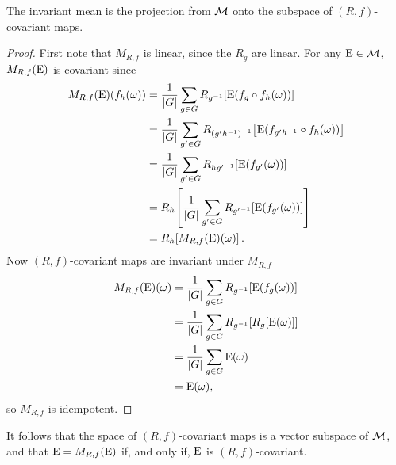 \begin{lem}\label{lem:inv-mean-proj}
  The invariant mean is the projection from $\mathcal{M}$ onto the subspace of $(R,f)$-covariant maps.
  \begin{proof}
    First note that $M_{R,f}$ is linear, since the $R_g$ are linear. For any $\operatorname{E}\in\mathcal{M}$, $M_{R,f}(\operatorname{E})$ is covariant since
    \begin{align}
      M_{R,f}(\operatorname{E})(f_h(\omega)) &= \frac{1}{{\left\lvert{G}\right\rvert}} \sum_{g\in G} R_{g^{-1}}\! \left[\operatorname{E}(f_g\circ f_h(\omega))\right]\\
                                 &= \frac{1}{{\left\lvert{G}\right\rvert}} \sum_{g^\prime\in G} R_{{(g^\prime h^{-1})}^{-1}}\! \left[\operatorname{E}(f_{g^\prime h^{-1}}\circ f_h(\omega))\right]\\
                                 &= \frac{1}{{\left\lvert{G}\right\rvert}} \sum_{g^\prime\in G} R_{h{g^\prime}^{-1}} \! \left[\operatorname{E}(f_{g^\prime}(\omega))\right]\\
                                 &= R_h\!\left[\frac{1}{{\left\lvert{G}\right\rvert}} \sum_{g^\prime\in G} R_{{g^\prime}^{-1}} \! \left[\operatorname{E}(f_{g^\prime}(\omega))\right]\right]\\
                                 &= R_h\!\left[M_{R,f}(\operatorname{E})(\omega)\right].
    \end{align}
    Now $(R,f)$-covariant maps are invariant under $M_{R,f}$
    \begin{align}
      M_{R,f}(\operatorname{E})(\omega) &= \frac{1}{{\left\lvert{G}\right\rvert}}\sum_{g\in G} R_{g^{-1}}\! \left[\operatorname{E}(f_g(\omega))\right]\\
                            &= \frac{1}{{\left\lvert{G}\right\rvert}}\sum_{g\in G} R_{g^{-1}}\! \left[R_{g}\!\left[\operatorname{E}(\omega)\right]\right]\\
                            &= \frac{1}{{\left\lvert{G}\right\rvert}}\sum_{g\in G} \operatorname{E}(\omega)\\
                            &= \operatorname{E}(\omega),
    \end{align}
    so $M_{R,f}$ is idempotent.
  \end{proof}
\end{lem}
It follows that the space of $(R,f)$-covariant maps is a vector subspace of $\mathcal{M}$, and that $\operatorname{E}=M_{R,f}(\operatorname{E})$ if, and only if, $\operatorname{E}$ is $(R,f)$-covariant.

